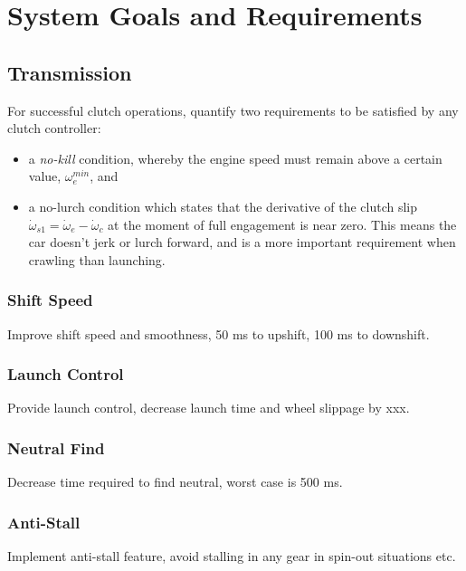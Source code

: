 \chapter{System Goals and Requirements}


\section{Transmission}

For successful clutch operations, \citet{clutch_control} quantify two requirements to be satisfied by any clutch controller:
\begin{itemize}
  \item a \emph{no-kill} condition, whereby the engine speed must remain above a certain value, $\omega_e^{min}$, and
  \item a no-lurch condition which states that the derivative of the clutch slip $\dot{\omega}_{s1}=\dot{\omega}_e-\dot{\omega}_c$ at the moment of full engagement is near zero. This means the car doesn't jerk or lurch forward, and is a more important requirement when crawling than launching.
\end{itemize}



\subsection{Shift Speed}

Improve shift speed and smoothness, 50 ms to upshift, 100 ms to downshift.


\subsection{Launch Control}

Provide launch control, decrease launch time and wheel slippage by
xxx.


\subsection{Neutral Find}

Decrease time required to find neutral, worst case is 500 ms.


\subsection{Anti-Stall}

Implement anti-stall feature, avoid stalling in any gear in spin-out
situations etc.


